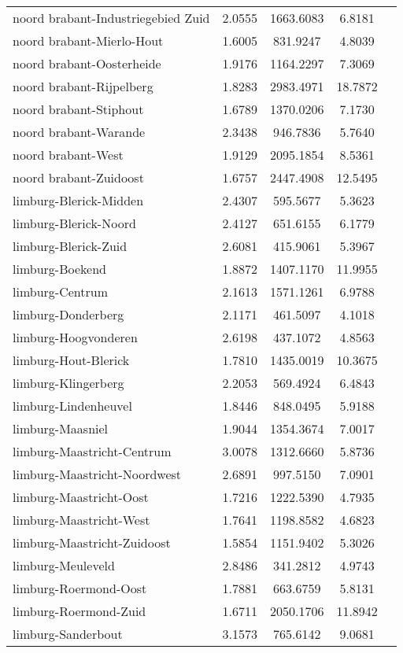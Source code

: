 \begin{longtable}{llccc}
noord brabant-Industriegebied Zuid & 2.0555 & 1663.6083 & 6.8181 \\
noord brabant-Mierlo-Hout & 1.6005 & 831.9247 & 4.8039 \\
noord brabant-Oosterheide & 1.9176 & 1164.2297 & 7.3069 \\
noord brabant-Rijpelberg & 1.8283 & 2983.4971 & 18.7872 \\
noord brabant-Stiphout & 1.6789 & 1370.0206 & 7.1730 \\
noord brabant-Warande & 2.3438 & 946.7836 & 5.7640 \\
noord brabant-West & 1.9129 & 2095.1854 & 8.5361 \\
noord brabant-Zuidoost & 1.6757 & 2447.4908 & 12.5495 \\
limburg-Blerick-Midden & 2.4307 & 595.5677 & 5.3623 \\
limburg-Blerick-Noord & 2.4127 & 651.6155 & 6.1779 \\
limburg-Blerick-Zuid & 2.6081 & 415.9061 & 5.3967 \\
limburg-Boekend & 1.8872 & 1407.1170 & 11.9955 \\
limburg-Centrum & 2.1613 & 1571.1261 & 6.9788 \\
limburg-Donderberg & 2.1171 & 461.5097 & 4.1018 \\
limburg-Hoogvonderen & 2.6198 & 437.1072 & 4.8563 \\
limburg-Hout-Blerick & 1.7810 & 1435.0019 & 10.3675 \\
limburg-Klingerberg & 2.2053 & 569.4924 & 6.4843 \\
limburg-Lindenheuvel & 1.8446 & 848.0495 & 5.9188 \\
limburg-Maasniel & 1.9044 & 1354.3674 & 7.0017 \\
limburg-Maastricht-Centrum & 3.0078 & 1312.6660 & 5.8736 \\
limburg-Maastricht-Noordwest & 2.6891 & 997.5150 & 7.0901 \\
limburg-Maastricht-Oost & 1.7216 & 1222.5390 & 4.7935 \\
limburg-Maastricht-West & 1.7641 & 1198.8582 & 4.6823 \\
limburg-Maastricht-Zuidoost & 1.5854 & 1151.9402 & 5.3026 \\
limburg-Meuleveld & 2.8486 & 341.2812 & 4.9743 \\
limburg-Roermond-Oost & 1.7881 & 663.6759 & 5.8131 \\
limburg-Roermond-Zuid & 1.6711 & 2050.1706 & 11.8942 \\
limburg-Sanderbout & 3.1573 & 765.6142 & 9.0681 \\

\end{longtable}
